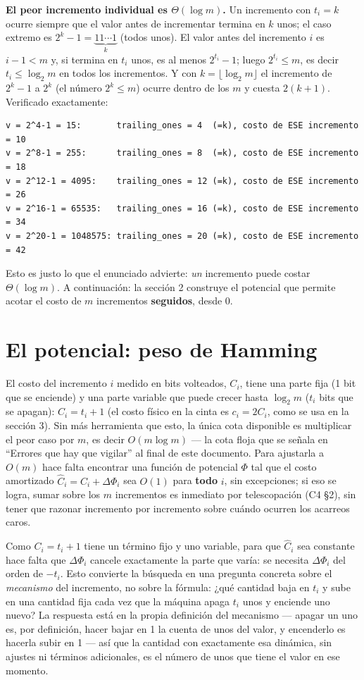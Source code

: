 \documentclass[11pt]{article}
\begin{document}
\textbf{El peor incremento individual es $\Theta(\log m)$.} Un incremento con $t_i=k$ ocurre siempre que el
valor antes de incrementar termina en $k$ unos; el caso extremo es $2^k-1 = \underbrace{11\cdots1}_{k}$
(todos unos). El valor antes del incremento $i$ es $i-1<m$ y, si termina en $t_i$ unos, es al menos
$2^{t_i}-1$; luego $2^{t_i}\le m$, es decir $t_i\le\log_2 m$ en todos los incrementos. Y con
$k=\lfloor\log_2 m\rfloor$ el incremento de $2^k-1$ a $2^k$ (el número $2^k\le m$) ocurre dentro de los $m$ y
cuesta $2(k+1)$. Verificado exactamente:

\begin{lstlisting}[style=salida]
v = 2^4-1 = 15:       trailing_ones = 4  (=k), costo de ESE incremento = 10
v = 2^8-1 = 255:      trailing_ones = 8  (=k), costo de ESE incremento = 18
v = 2^12-1 = 4095:    trailing_ones = 12 (=k), costo de ESE incremento = 26
v = 2^16-1 = 65535:   trailing_ones = 16 (=k), costo de ESE incremento = 34
v = 2^20-1 = 1048575: trailing_ones = 20 (=k), costo de ESE incremento = 42
\end{lstlisting}

Esto es justo lo que el enunciado advierte: \emph{un} incremento puede costar $\Theta(\log m)$. A
continuación: la sección 2 construye el potencial que permite acotar el costo de $m$ incrementos
\textbf{seguidos}, desde 0.

\section{El potencial: peso de Hamming}

El costo del incremento $i$ medido en bits volteados, $C_i$, tiene una parte fija (1 bit que se enciende) y
una parte variable que puede crecer hasta $\log_2 m$ ($t_i$ bits que se apagan): $C_i=t_i+1$ (el costo
físico en la cinta es $c_i=2C_i$, como se usa en la sección 3). Sin más herramienta que esto, la única cota
disponible es multiplicar el peor caso por $m$, es decir $O(m\log m)$ --- la cota floja que se señala en
``Errores que hay que vigilar'' al final de este documento. Para ajustarla a $O(m)$ hace falta encontrar una
función de potencial $\Phi$ tal que el costo amortizado $\hat C_i=C_i+\Delta\Phi_i$ sea $O(1)$ para
\textbf{todo} $i$, sin excepciones; si eso se logra, sumar sobre los $m$ incrementos es inmediato por
telescopación (C4 §2), sin tener que razonar incremento por incremento sobre cuándo ocurren los acarreos
caros.

Como $C_i=t_i+1$ tiene un término fijo y uno variable, para que $\hat C_i$ sea constante hace falta que
$\Delta\Phi_i$ cancele exactamente la parte que varía: se necesita $\Delta\Phi_i$ del orden de $-t_i$. Esto
convierte la búsqueda en una pregunta concreta sobre el \emph{mecanismo} del incremento, no sobre la
fórmula: ¿qué cantidad baja en $t_i$ y sube en una cantidad fija cada vez que la máquina apaga $t_i$ unos y
enciende uno nuevo? La respuesta está en la propia definición del mecanismo --- apagar un uno es, por
definición, hacer bajar en 1 la cuenta de unos del valor, y encenderlo es hacerla subir en 1 --- así que la
cantidad con exactamente esa dinámica, sin ajustes ni términos adicionales, es el número de unos que tiene
el valor en ese momento.
\end{document}
